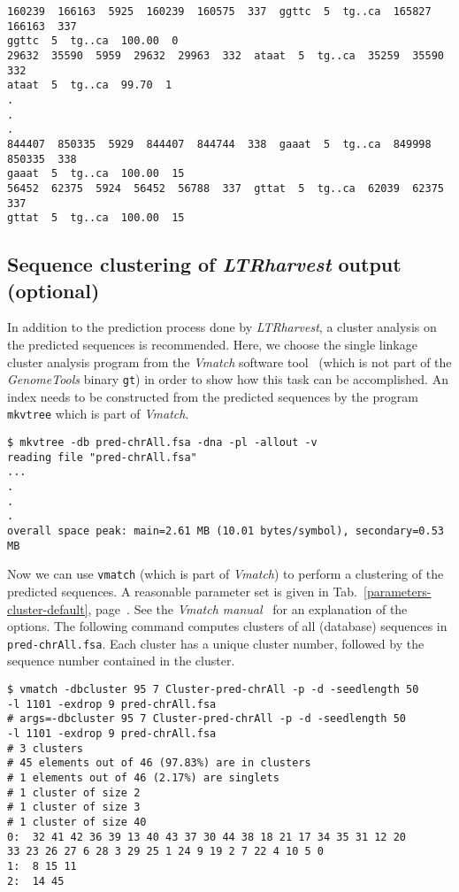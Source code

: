 \documentclass[12pt,titlepage]{article}
\newcommand{\LTRharvest}{\textit{LTRharvest}\xspace}
\newcommand{\GenomeTools}{\textit{GenomeTools}\xspace}
\newcommand{\Gt}{\texttt{gt}\xspace}
\begin{document}
\begin{footnotesize}
\begin{verbatim}
160239  166163  5925  160239  160575  337  ggttc  5  tg..ca  165827  166163  337
ggttc  5  tg..ca  100.00  0
29632  35590  5959  29632  29963  332  ataat  5  tg..ca  35259  35590  332
ataat  5  tg..ca  99.70  1
.
.
.
844407  850335  5929  844407  844744  338  gaaat  5  tg..ca  849998  850335  338
gaaat  5  tg..ca  100.00  15
56452  62375  5924  56452  56788  337  gttat  5  tg..ca  62039  62375  337
gttat  5  tg..ca  100.00  15
\end{verbatim}
\end{footnotesize}

\subsection{Sequence clustering of \LTRharvest output (optional)}
\label{ExampleCluster}

In addition to the prediction process done by \LTRharvest,
a cluster analysis on the predicted
sequences is recommended. Here, we choose the single linkage cluster
analysis program from the
\textit{Vmatch} software tool~\cite{vmatch}
(which is not part of the \GenomeTools binary \Gt)
in order to show how this task can be accomplished.
An index needs to be constructed from the predicted sequences by the program
\texttt{mkvtree} which is part of \textit{Vmatch}.

\begin{footnotesize}
\begin{verbatim}
$ mkvtree -db pred-chrAll.fsa -dna -pl -allout -v
reading file "pred-chrAll.fsa"
...
.
.
.
overall space peak: main=2.61 MB (10.01 bytes/symbol), secondary=0.53 MB
\end{verbatim}
\end{footnotesize}

Now we can use \texttt{vmatch} (which is part of \textit{Vmatch})
to perform a clustering of the predicted sequences.
A reasonable parameter set is given in
Tab.~\ref{parameters-cluster-default},
page~\pageref{parameters-cluster-default}.
See the \emph{Vmatch manual}~\cite{vmatch} for an explanation of the
options. The following command computes clusters of all (database) sequences in
\texttt{\small{pred-chrAll.fsa}}. Each cluster has a unique cluster number,
followed by the sequence number contained in the cluster.

\begin{footnotesize}
\begin{verbatim}
$ vmatch -dbcluster 95 7 Cluster-pred-chrAll -p -d -seedlength 50
-l 1101 -exdrop 9 pred-chrAll.fsa
# args=-dbcluster 95 7 Cluster-pred-chrAll -p -d -seedlength 50
-l 1101 -exdrop 9 pred-chrAll.fsa
# 3 clusters
# 45 elements out of 46 (97.83%) are in clusters
# 1 elements out of 46 (2.17%) are singlets
# 1 cluster of size 2
# 1 cluster of size 3
# 1 cluster of size 40
0:  32 41 42 36 39 13 40 43 37 30 44 38 18 21 17 34 35 31 12 20
33 23 26 27 6 28 3 29 25 1 24 9 19 2 7 22 4 10 5 0
1:  8 15 11
2:  14 45
\end{verbatim}
\end{footnotesize}
\end{document}
